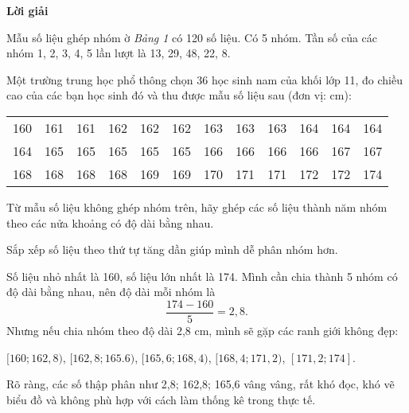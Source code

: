 \documentclass[
  letterpaper,
  DIV=11,
  numbers=noendperiod]{scrartcl}
\begin{document}
\begin{center}
\textbf{Lời giải}
\end{center}

Mẫu số liệu ghép nhóm ờ \emph{Bảng 1} có 120 số liệu. Có 5 nhóm. Tần số
của các nhóm 1, 2, 3, 4, 5 lần lượt là 13, 29, 48, 22, 8.

Một trường trung học phổ thông chọn 36 học sinh nam của khối lớp 11, đo
chiều cao của các bạn học sinh đó và thu được mẫu số liệu sau (đơn vị:
cm):

\begin{table}[!h]
\centering
\begin{tabular}{cccccccccccc}
\toprule
160 & 161 & 161 & 162 & 162 & 162 & 163 & 163 & 163 & 164 & 164 & 164\\
164 & 165 & 165 & 165 & 165 & 165 & 166 & 166 & 166 & 166 & 167 & 167\\
168 & 168 & 168 & 168 & 169 & 169 & 170 & 171 & 171 & 172 & 172 & 174\\
\bottomrule
\end{tabular}
\end{table}

Từ mẫu số liệu không ghép nhóm trên, hãy ghép các số liệu thành năm nhóm
theo các nửa khoảng có độ dài bằng nhau.

\begin{tcolorbox}[enhanced jigsaw, toprule=.15mm, colframe=quarto-callout-tip-color-frame, left=2mm, opacityback=0, colbacktitle=quarto-callout-tip-color!10!white, rightrule=.15mm, bottomrule=.15mm, titlerule=0mm, bottomtitle=1mm, colback=white, leftrule=.75mm, title=\textcolor{quarto-callout-tip-color}{\faLightbulb}\hspace{0.5em}{Mẹo}, toptitle=1mm, arc=.35mm, breakable, opacitybacktitle=0.6, coltitle=black]

Sắp xếp số liệu theo thứ tự tăng dần giúp mình dễ phân nhóm hơn.

\end{tcolorbox}

Số liệu nhỏ nhất là 160, số liệu lớn nhất là 174. Mình cần chia thành 5
nhóm có độ dài bằng nhau, nên độ dài mỗi nhóm là \[
\frac{174-160}{5}=2,8.
\] Nhưng nếu chia nhóm theo độ dài 2,8 cm, mình sẽ gặp các ranh giới
không đẹp:

\([160;162,8)\), \([162,8;165.6)\), \([165,6;168,4)\),
\([168,4;171,2)\), \([171,2;174]\).

Rõ ràng, các số thập phân như 2,8; 162,8; 165,6 vâng vâng, rất khó đọc,
khó vẽ biểu đồ và không phù hợp với cách làm thống kê trong thực tế.
\end{document}
